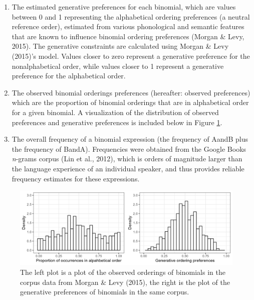 \documentclass[10pt, letterpaper]{article}
\newenvironment{CodeChunk}{}{}
\begin{document}
\begin{enumerate}
\def\labelenumi{\arabic{enumi}.}
\item
  The estimated generative preferences for each binomial, which are
  values between 0 and 1 representing the alphabetical ordering
  preferences (a neutral reference order), estimated from various
  phonological and semantic features that are known to influence
  binomial ordering preferences (Morgan \& Levy, 2015). The generative
  constraints are calculated using Morgan \& Levy (2015)'s model. Values
  closer to zero represent a generative preference for the
  nonalphabetical order, while values closer to 1 represent a generative
  preference for the alphabetical order.
\item
  The observed binomial orderings preferences (hereafter: observed
  preferences) which are the proportion of binomial orderings that are
  in alphabetical order for a given binomial. A visualization of the
  distribution of observed preferences and generative preferences is
  included below in Figure \ref{fig:corpusplot1}.
\item
  The overall frequency of a binomial expression (the frequency of AandB
  plus the frequency of BandA). Frequencies were obtained from the
  Google Books \emph{n}-grams corpus (Lin et al., 2012), which is orders
  of magnitude larger than the language experience of an individual
  speaker, and thus provides reliable frequency estimates for these
  expressions.
\end{enumerate}

\begin{CodeChunk}
\begin{figure}[tb]

{\centering \includegraphics[width=1\linewidth]{Figures/corpus_plots} 

}

\caption[The left plot is a plot of the observed orderings of binomials in the corpus data from Morgan \& Levy (2015), the right is the plot of the generative preferences of binomials in the same corpus]{The left plot is a plot of the observed orderings of binomials in the corpus data from Morgan \& Levy (2015), the right is the plot of the generative preferences of binomials in the same corpus.}\label{fig:corpusplot1}
\end{figure}
\end{CodeChunk}
\end{document}
